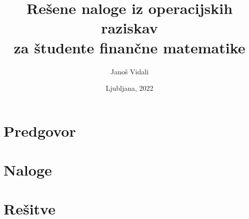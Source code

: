 \documentclass[a4paper, 11pt, titlepage, twoside]{article}
\begin{document}
\title{Rešene naloge iz operacijskih raziskav \\
{\Large za študente finančne matematike}}
\author{\Large Janoš Vidali}
\date{\vfill Ljubljana, 2022}
\maketitle

\cleardoublepage

\setcounter{tocdepth}{2}
\tableofcontents

\cleardoublepage

\section*{Predgovor}

{



}

\cleardoublepage



\section{Naloge}
{


}

\cleardoublepage

\section{Rešitve}
{


}

\cleardoublepage



\end{document}
